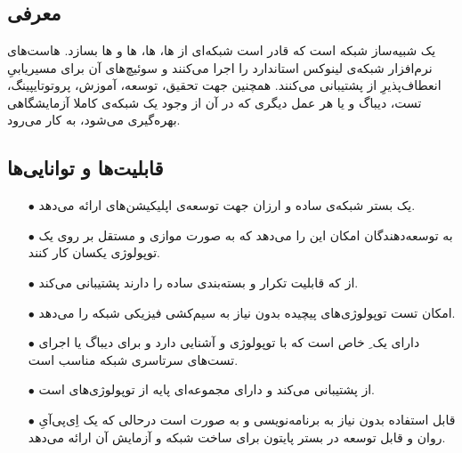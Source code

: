 \documentclass{article}
\begin{document}


\newpage


\section{}%
\subsection{معرفی}
 یک شبیه‌ساز شبکه است که قادر است شبکه‌ای از ها، ها، ها و ها بسازد. هاست‌های  نرم‌افزار شبکه‌ی لینوکس استاندارد را اجرا می‌کنند و سوئیچ‌های آن برای مسیریابیِ انعطاف‌پذیرِ  از  پشتیبانی می‌کنند. همچنین  جهت تحقیق، توسعه، آموزش، پروتوتایپینگ، تست، دیباگ و یا هر عمل دیگری که در آن از وجود یک شبکه‌ی کاملا آزمایشگاهی بهره‌گیری می‌شود، به کار می‌رود.
\subsection{قابلیت‌ها و توانایی‌ها}
\begin{itemize}
    \item [$\bullet$]  یک بستر شبکه‌ی ساده و ارزان جهت توسعه‌ی اپلیکیشن‌های  ارائه می‌دهد.
    \item [$\bullet$]  به توسعه‌دهندگان امکان این را می‌دهد که به صورت موازی و مستقل بر روی یک توپولوژی یکسان کار کنند.
    \item [$\bullet$]  از  که قابلیت تکرار و بسته‌بندی ساده را دارند پشتیبانی می‌کند.
    \item [$\bullet$]  امکان تست توپولوژی‌های پیچیده بدون نیاز به سیم‌کشی فیزیکی شبکه را می‌دهد.
    \item [$\bullet$]  دارای یک ِ خاص است که با توپولوژی و  آشنایی دارد و برای دیباگ یا اجرای تست‌های سرتاسری شبکه مناسب است.
    \item [$\bullet$]  از  پشتیبانی می‌کند و دارای مجموعه‌ای پایه از توپولوژی‌های  است.
    \item [$\bullet$]  قابل استفاده بدون نیاز به برنامه‌نویسی و به صورت  است درحالی که یک اِی‌پی‌آیِ روان و قابل توسعه در بستر پایتون برای ساخت شبکه و آزمایش آن ارائه می‌دهد.

\end{itemize}
\end{document}
